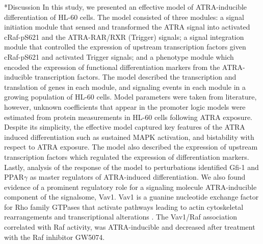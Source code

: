 \documentclass[12pt]{article}
\makeatletter
\renewcommand\section{\@startsection
	{subsection}{2}{0mm}
	{-0.2in}
	{0.05\baselineskip}
	{\normalfont\large\bfseries}}
\makeatother
\begin{document}
\clearpage


\section*{Discussion}
In this study, we presented an effective model of ATRA-inducible differentiation of HL-60 cells.
The model consisted of three modules: a signal initiation module that sensed and transformed the ATRA signal into activated cRaf-pS621 and the ATRA-RAR/RXR (Trigger) signals;
a signal integration module that controlled the expression of upstream transcription factors given cRaf-pS621 and activated Trigger signals; and
a phenotype module which encoded the expression of functional differentiation markers from the ATRA-inducible transcription factors.
The model described the transcription and translation of genes in each module, and signaling events in each module in a growing population of HL-60 cells.
Model parameters were taken from literature, however, unknown coefficients
that appear in the promoter logic models were estimated from protein measurements in HL-60 cells following ATRA exposure.
Despite its simplicity, the effective model captured key features of the ATRA induced differentiation such as
sustained MAPK activation, and bistability with respect to ATRA exposure.
The model also described the expression of upstream transcription factors which regulated the expression of differentiation markers.
Lastly, analysis of the response of the model to perturbations identified Gfi-1 and PPAR$\gamma$ as master regulators of ATRA-induced differentiation.
We also found evidence of a prominent regulatory role for a signaling molecule ATRA-inducible component of the signalsome, Vav1.
Vav1 is a guanine nucleotide exchange factor for Rho family GTPases that activate pathways leading to actin cytoskeletal rearrangements and transcriptional alterations \cite{Hornstein:2004aa}.
The Vav1/Raf association correlated with Raf activity, was ATRA-inducible and decreased after treatment with the Raf inhibitor GW5074.
\end{document}
